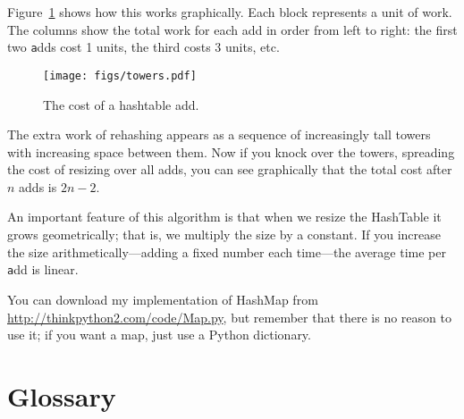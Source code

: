 \documentclass[
DIV=11,
fontsize=12,
twoside,
headinclude=false,
titlepage=firstiscover,
abstract=true,
headsepline=true,
footsepline=true,
chapterprefix=true, %
headings=big,
bibliography=totoc,%
captions=tableheading
]{scrbook}
\theoremstyle{definition}
\begin{document}
Figure~\ref{fig.hash} shows how this works graphically.  Each
block represents a unit of work.  The columns show the total
work for each add in order from left to right: the first two
{\texttt adds} cost 1 units, the third costs 3 units, etc.

\begin{figure}
\centerline{\texttt{[image: figs/towers.pdf]}}
\caption{The cost of a hashtable add.\label{fig.hash}}
\end{figure}

The extra work of rehashing appears as a sequence of increasingly
tall towers with increasing space between them.  Now if you knock
over the towers, spreading the cost of resizing over all
adds, you can see graphically that the total cost after $n$
adds is $2n - 2$.

An important feature of this algorithm is that when we resize the
HashTable it grows geometrically; that is, we multiply the size by a
constant.  If you increase the size
arithmetically---adding a fixed number each time---the average time
per {\texttt add} is linear.

You can download my implementation of HashMap from
\url{http://thinkpython2.com/code/Map.py}, but remember that there
is no reason to use it; if you want a map, just use a Python dictionary.

\section{Glossary}
\end{document}
